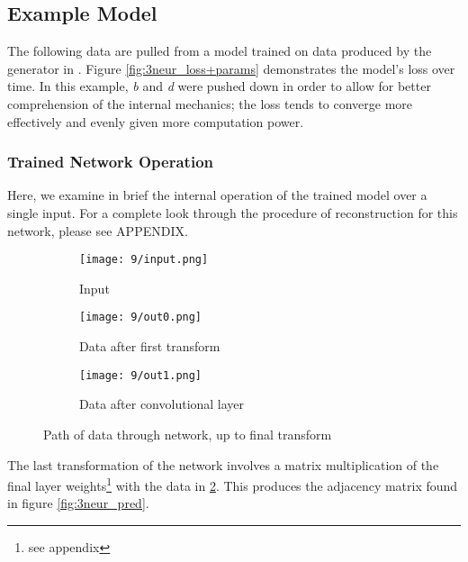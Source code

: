 \subsection{Example Model}
\label{subsec:3neurex}
The following data are pulled from a model trained on data produced by the 
generator in . Figure 
\ref{fig:3neur_loss+params} demonstrates the model's loss over time. In this 
example, \textit{b} and \textit{d} were pushed down in order to allow for better 
comprehension of the internal mechanics; the loss tends to converge more 
effectively and evenly given more computation power.


\subsubsection{Trained Network Operation}
Here, we examine in brief the internal operation of the trained model over a 
single input. For a complete look through the procedure of reconstruction for 
this network, please see APPENDIX.
\begin{figure}[h]
	\centering
	\begin{subfigure}{.15\textwidth}
		\centering
		\texttt{[image: 9/input.png]}
		\caption{Input}
		\label{subfig:3neur_in}
	\end{subfigure}
	\hspace{1em}
	\begin{subfigure}{.3\textwidth}
		\texttt{[image: 9/out0.png]}
		\caption{Data after first transform}
	\end{subfigure}
	\hspace{1em}
	\begin{subfigure}{.3\textwidth}
		\texttt{[image: 9/out1.png]}
		\caption{Data after convolutional layer}
		\label{subfig:3neur_out1}
	\end{subfigure}
	\caption{Path of data through network, up to final transform}
	\label{fig:3neur_input}
\end{figure}

The last transformation of the network involves a matrix multiplication of the 
final layer weights\footnote{see appendix} with the data in 
\ref{subfig:3neur_out1}. This produces the adjacency matrix found in figure 
\ref{fig:3neur_pred}.

\begin{table}[h]
	\centering
	\label{fig:3neur_pred}
\end{table}

